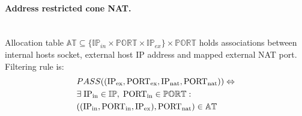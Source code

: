 \documentclass{llncs}
\begin{document}
\paragraph{Address restricted cone NAT.} ~\\
Allocation table $\mathbb{AT} \subseteq \{\mathbb{IP}_{in} \times \mathbb{PORT} \times \mathbb{IP}_{ex}\} \times \mathbb{PORT}$ 
holds associations between internal hosts socket, external host IP address and mapped external NAT port. 
Filtering rule is:
\begin{align*}
& PASS((\text{IP\textsubscript{ex}}, \text{PORT\textsubscript{ex}}, \text{IP\textsubscript{nat}}, \text{PORT\textsubscript{nat}} )) \Leftrightarrow \\
&  \exists \; \text{IP\textsubscript{in}} \in \mathbb{IP}, \; \text{PORT\textsubscript{in}} \in \mathbb{PORT}:\\
& ((\text{IP\textsubscript{in}}, \text{PORT\textsubscript{in}}, \text{IP\textsubscript{ex}}), \text{PORT\textsubscript{nat}} ) \in \mathbb{AT}
\end{align*}

%



\end{document}
